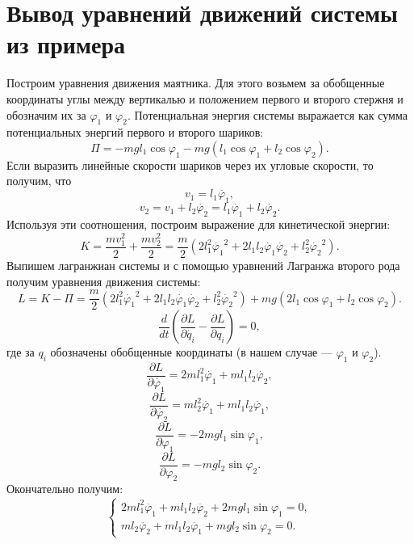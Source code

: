 \documentclass[12pt]{article}
\begin{document}
\section{Вывод уравнений движений системы из примера}
        Построим уравнения движения маятника. Для этого возьмем за обобщенные координаты углы между вертикалью и положением первого и второго стержня и обозначим их за $\varphi_1$ и $\varphi_2$.
        Потенциальная энергия системы выражается как сумма потенциальных энергий первого и второго шариков:
        $$
            \Pi = - m g l_1 \cos \varphi_1 - m g (l_1 \cos \varphi_1 + l_2 \cos \varphi_2).
        $$
        Если выразить линейные скорости шариков через их угловые скорости, то получим, что
        $$
            v_1 = l_1 \dot{\varphi_1},
        $$
        $$
            v_2 = v_1 + l_2 \dot{\varphi_2} = l_1 \dot{\varphi_1} + l_2 \dot{\varphi_2}.
        $$
        Используя эти соотношения, построим выражение для кинетической энергии:
        $$
            K = \dfrac{m v_1^2}{2} + \dfrac{m v_2^2}{2} = \dfrac{m}{2} \left( 2 l_1^2 \dot{\varphi_1}^2 + 2 l_1 l_2 \dot{\varphi_1} \dot{\varphi_2} +  l_2^2 \dot{\varphi_2}^2\right).
        $$
        Выпишем лагранжиан системы и с помощью уравнений Лагранжа второго рода получим уравнения движения системы:
        $$
            L = K - \Pi = \dfrac{m}{2} \left( 2 l_1^2 \dot{\varphi_1}^2 + 2 l_1 l_2 \dot{\varphi_1} \dot{\varphi_2} +  l_2^2 \dot{\varphi_2}^2\right) + m g (2 l_1 \cos \varphi_1 + l_2 \cos \varphi_2).
        $$
        $$
            \dfrac{d}{dt} \left( \dfrac{\partial L}{\partial \dot{q_i}} - \dfrac{\partial L}{\partial q_i} \right) = 0,
        $$
        где за $q_i$ обозначены обобщенные координаты (в нашем случае --- $\varphi_1$ и $\varphi_2$).
        $$
            \dfrac{\partial L}{\partial \dot{\varphi_1}} = 2 m l_1^2 \dot{\varphi_1} + m l_1 l_2 \dot{\varphi_2},
        $$
        $$
            \dfrac{\partial L}{\partial \dot{\varphi_2}} = m l_2^2 \dot{\varphi_1} + m l_1 l_2 \dot{\varphi_1},
        $$
        $$
            \dfrac{\partial L}{\partial \varphi_1} = - 2 m g l_1 \sin \varphi_1,
        $$
        $$
            \dfrac{\partial L}{\partial \varphi_2} = - m g l_2 \sin \varphi_2.
        $$
        Окончательно получим:
        $$
            \begin{cases}
                2 m l_1^2 \ddot{\varphi_1} + m l_1 l_2 \ddot{\varphi_2} + 2 m g l_1 \sin \varphi_1 = 0, \\
                m l_2 \ddot{\varphi_2} + m l_1 l_2 \ddot{\varphi_1} + m g l_2 \sin \varphi_2 = 0.
            \end{cases}
        $$
\end{document}
